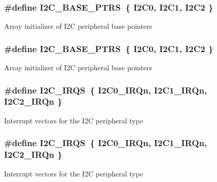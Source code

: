 \subsubsection[{\texorpdfstring{I2\+C\+\_\+\+B\+A\+S\+E\+\_\+\+P\+T\+RS}{I2C_BASE_PTRS}}]{\setlength{\rightskip}{0pt plus 5cm}\#define I2\+C\+\_\+\+B\+A\+S\+E\+\_\+\+P\+T\+RS~\{ {\bf I2\+C0}, {\bf I2\+C1}, {\bf I2\+C2} \}}\hypertarget{group__I2C__Peripheral__Access__Layer_gaee17f364d6d1712b62774e6c33dea554}{}\label{group__I2C__Peripheral__Access__Layer_gaee17f364d6d1712b62774e6c33dea554}
Array initializer of I2C peripheral base pointers 
\subsubsection[{\texorpdfstring{I2\+C\+\_\+\+B\+A\+S\+E\+\_\+\+P\+T\+RS}{I2C_BASE_PTRS}}]{\setlength{\rightskip}{0pt plus 5cm}\#define I2\+C\+\_\+\+B\+A\+S\+E\+\_\+\+P\+T\+RS~\{ {\bf I2\+C0}, {\bf I2\+C1}, {\bf I2\+C2} \}}\hypertarget{group__I2C__Peripheral__Access__Layer_gaee17f364d6d1712b62774e6c33dea554}{}\label{group__I2C__Peripheral__Access__Layer_gaee17f364d6d1712b62774e6c33dea554}
Array initializer of I2C peripheral base pointers 
\subsubsection[{\texorpdfstring{I2\+C\+\_\+\+I\+R\+QS}{I2C_IRQS}}]{\setlength{\rightskip}{0pt plus 5cm}\#define I2\+C\+\_\+\+I\+R\+QS~\{ {\bf I2\+C0\+\_\+\+I\+R\+Qn}, {\bf I2\+C1\+\_\+\+I\+R\+Qn}, {\bf I2\+C2\+\_\+\+I\+R\+Qn} \}}\hypertarget{group__I2C__Peripheral__Access__Layer_gaa8773ffc80a322ac3833d4ad1853185a}{}\label{group__I2C__Peripheral__Access__Layer_gaa8773ffc80a322ac3833d4ad1853185a}
Interrupt vectors for the I2C peripheral type 
\subsubsection[{\texorpdfstring{I2\+C\+\_\+\+I\+R\+QS}{I2C_IRQS}}]{\setlength{\rightskip}{0pt plus 5cm}\#define I2\+C\+\_\+\+I\+R\+QS~\{ {\bf I2\+C0\+\_\+\+I\+R\+Qn}, {\bf I2\+C1\+\_\+\+I\+R\+Qn}, {\bf I2\+C2\+\_\+\+I\+R\+Qn} \}}\hypertarget{group__I2C__Peripheral__Access__Layer_gaa8773ffc80a322ac3833d4ad1853185a}{}\label{group__I2C__Peripheral__Access__Layer_gaa8773ffc80a322ac3833d4ad1853185a}
Interrupt vectors for the I2C peripheral type 